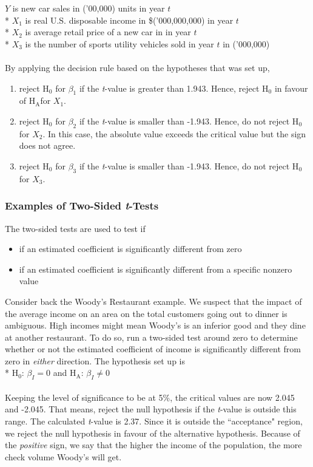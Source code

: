 \documentclass[11pt]{article}
\begin{document}
$Y$ is new car sales in ('00,000) units in year $t$\\*
$X_1$ is real U.S. disposable income in \$('000,000,000) in year $t$\\*
$X_2$ is average retail price of a new car in in year $t$\\*
$X_3$ is the number of sports utility vehicles sold in year $t$ in ('000,000)\\ \\
By applying the decision rule based on the hypotheses that was set up,
\begin{enumerate}
\item reject H$_0$ for $\beta_1$ if the \textit{t}-value is greater than 1.943. Hence, reject H$_0$ in favour of H$_\text{A}$for $X_1$.
\item reject H$_0$ for $\beta_2$ if the \textit{t}-value is smaller than -1.943. Hence, do not reject H$_0$ for $X_2$. In this case, the absolute value exceeds the critical value but the sign does not agree.
\item reject H$_0$ for $\beta_3$ if the \textit{t}-value is smaller than -1.943. Hence, do not reject H$_0$ for $X_3$. 
\end{enumerate}
\subsubsection{Examples of Two-Sided \textit{t}-Tests}
The two-sided tests are used to test if
\begin{itemize}
\item if an estimated coefficient is significantly different from zero
\item if an estimated coefficient is significantly different from a specific nonzero value
\end{itemize}
Consider back the Woody's Restaurant example. We suspect that the impact of the average income on an area on the total customers going out to dinner is ambiguous. High incomes might mean Woody's is an inferior good and they dine at another restaurant. To do so, run a two-sided test around zero to determine whether or not the estimated coefficient of income is significantly different from zero in \textit{either} direction. The hypothesis set up is \\* $\text{H}_0\text{: }\beta_I = 0$ and $\text{H}_\text{A}\text{: } \beta_I \neq 0$ \\ \\
Keeping the level of significance to be at 5\%, the critical values are now 2.045 and -2.045. That means, reject the null hypothesis if the \textit{t}-value is outside this range. The calculated \textit{t}-value is 2.37. Since it is outside the ``acceptance" region, we reject the null hypothesis in favour of the alternative hypothesis. Because of the \textit{positive} sign, we say that the higher the income of the population, the more check volume Woody's will get. 
\end{document}

